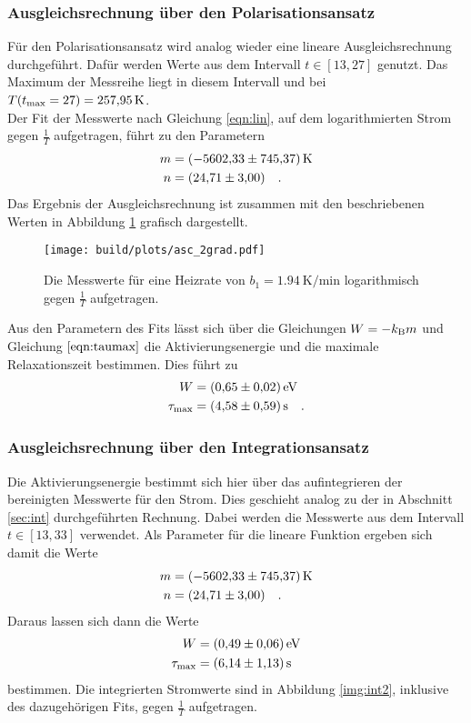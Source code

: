 \subsubsection{Ausgleichsrechnung über den Polarisationsansatz}

\noindent
Für den Polarisationsansatz wird analog wieder eine lineare Ausgleichsrechnung durchgeführt.
Dafür werden Werte aus dem Intervall $t \in [13,27]$ genutzt.
Das Maximum der Messreihe liegt in diesem Intervall und bei $T(t_\t{max} = 27) = \SI{257.95}{\kelvin}$. \\
Der Fit der Messwerte nach Gleichung \ref{eqn:lin}, auf dem logarithmierten Strom gegen $\frac{1}{T}$ aufgetragen, führt zu den Parametern
\begin{align*}
  m & = \SI{ -5602.33( 74537)}{\kelvin}\\
  n & = \SI{24.71(300)}{} \quad .
\end{align*}
Das Ergebnis der Ausgleichsrechnung ist zusammen mit den beschriebenen Werten in Abbildung \ref{img:pol2} grafisch dargestellt.

\begin{figure}[ht]
  \centering
  \texttt{[image: build/plots/asc\_2grad.pdf]}
  \caption{Die Messwerte für eine Heizrate von $b_1 = \SI{1.94}{\kelvin\per\minute}$ 
          logarithmisch gegen $\frac{1}{T}$ aufgetragen.}
  \label{img:pol2}
\end{figure}

\noindent
Aus den Parametern des Fits lässt sich über die Gleichungen $W = -k_\t{B} m$ und Gleichung $\ref{eqn:taumax}$ die Aktivierungsenergie und die maximale Relaxationszeit bestimmen.
Dies führt zu 
\begin{align*}
  W &= \SI{0.65 (002)}{\electronvolt}\\
  \tau_\t{max} &= \SI{4.58 (059)}{\second} \quad .
\end{align*}



\subsubsection{Ausgleichsrechnung über den Integrationsansatz}

\noindent
Die Aktivierungsenergie bestimmt sich hier über das aufintegrieren der bereinigten Messwerte für den Strom. 
Dies geschieht analog zu der in Abschnitt \ref{sec:int} durchgeführten Rechnung.
Dabei werden die Messwerte aus dem Intervall  $t \in [13,33]$ verwendet.
Als Parameter für die lineare Funktion ergeben sich damit die Werte
\begin{align*}
  m & = \SI{  -5602.33 (74537)}{\kelvin}\\
  n & = \SI{24.71 (300)}{} \quad .
\end{align*}
Daraus lassen sich dann die Werte 
\begin{align*}
  W &= \SI{ 0.49  (006)}{\electronvolt}\\
  \tau_\t{max} &= \SI{6.14 (113)}{\second}
\end{align*}
bestimmen. Die integrierten Stromwerte sind in Abbildung \ref{img:int2}, inklusive des dazugehörigen Fits, gegen $\frac{1}{T}$ aufgetragen.

